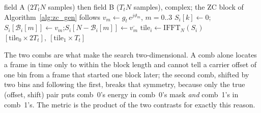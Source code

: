 \begin{algorithm}[H]
\caption{\textsc{GenNewmanPreamble}: the two tone fields (\texttt{FullOFDMModem.gen\_newman\_preamble}).}
\label{alg:tone_gen}
\begin{algorithmic}[1]
\Ensure field A ($2T_tN$ samples) then field B ($T_tN$ samples), complex; the ZC block of Algorithm~\ref{alg:zc_gen} follows
\State $v_m \gets g_t\, e^{j \vartheta_m}$, $m = 0..3$ 
 
    \State $S_i[k] \gets 0$;\quad $S_i[\mathcal{B}_i[m]] \gets v_m$;\quad $S_i[N - \mathcal{B}_i[m]] \gets \overline{v_m}$ 
    \State $\mathrm{tile}_i \gets \mathrm{IFFT}_N(S_i)$
\EndFor
\State \Return $[\mathrm{tile}_0 \times 2T_t],\ [\mathrm{tile}_1 \times T_t]$ 
\end{algorithmic}
\end{algorithm}

The two combs are what make the search two-dimensional.  A comb alone
locates a frame in time only to within the block length and cannot
tell a carrier offset of one bin from a frame that started one block
later; the second comb, shifted by two bins and following the first,
breaks that symmetry, because only the true (offset, shift) pair puts
comb~0's energy in comb~0's mask \emph{and} comb~1's in comb~1's.  The
metric is the product of the two contrasts for exactly this reason.

